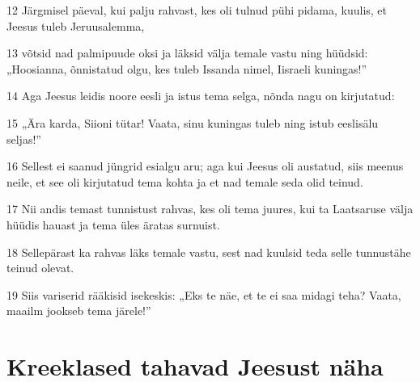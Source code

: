 \par 12 Järgmisel päeval, kui palju rahvast, kes oli tulnud pühi pidama, kuulis, et Jeesus tuleb Jeruusalemma,
\par 13 võtsid nad palmipuude oksi ja läksid välja temale vastu ning hüüdsid: „Hoosianna, õnnistatud olgu, kes tuleb Issanda nimel, Iisraeli kuningas!”
\par 14 Aga Jeesus leidis noore eesli ja istus tema selga, nõnda nagu on kirjutatud:
\par 15 „Ära karda, Siioni tütar! Vaata, sinu kuningas tuleb ning istub eeslisälu seljas!”
\par 16 Sellest ei saanud jüngrid esialgu aru; aga kui Jeesus oli austatud, siis meenus neile, et see oli kirjutatud tema kohta ja et nad temale seda olid teinud.
\par 17 Nii andis temast tunnistust rahvas, kes oli tema juures, kui ta Laatsaruse välja hüüdis hauast ja tema üles äratas surnuist.
\par 18 Sellepärast ka rahvas läks temale vastu, sest nad kuulsid teda selle tunnustähe teinud olevat.
\par 19 Siis variserid rääkisid isekeskis: „Eks te näe, et te ei saa midagi teha? Vaata, maailm jookseb tema järele!”

\section*{Kreeklased tahavad Jeesust näha}

